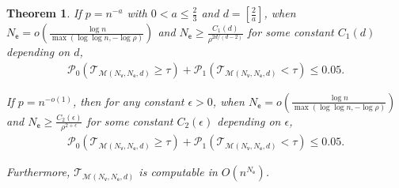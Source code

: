 \documentclass[letterpaper,11pt]{article}
\newtheorem{theorem}{Theorem}
\theoremstyle{definition}
\newcommand{\maM}{\mathcal{M}}
\newcommand{\maP}{\mathcal{P}}
\newcommand{\maT}{\mathcal{T}}
\newcommand{\pth}[1]{\left( #1 \right)}
\newcommand{\qth}[1]{\left[ #1 \right]}
\newcommand{\sfe}{{\mathsf{e}}}
\newcommand{\sfv}{{\mathsf{v}}}
\begin{document}
\begin{theorem}\label{thm:bd-degree-motif-main}
     If $p=n^{-a}$ with $0<a\le \frac{2}{3}$ and  $d=\qth{\frac{2}{a}}$, when $N_\sfe=o\pth{\frac{\log n}{\max\pth{\log\log n,-\log\rho}}}$ and $N_\sfe\ge \frac{C_1(d)}{\rho^{2d/(d-2)}}$ for some constant $C_1(d)$ depending on $d$,\begin{align*}
        \maP_0\pth{\maT_{\maM(N_\sfv,N_\sfe,d)}\ge \tau}+\maP_1\pth{\maT_{\maM(N_\sfv,N_\sfe,d)}<\tau}\le 0.05.
    \end{align*}

    If $p=n^{-o(1)}$, then for any constant $\epsilon>0$, when $N_\sfe = o\pth{\frac{\log n}{\max\pth{\log\log n,-\log\rho}}}$ and $N_\sfe\ge \frac{C_2(\epsilon)}{\rho^{2+\epsilon}}$ for some constant $C_2(\epsilon)$ depending on $\epsilon$,\begin{align*}
        \maP_0\pth{\maT_{\maM(N_\sfv,N_\sfe,d)}\ge \tau}+\maP_1\pth{\maT_{\maM(N_\sfv,N_\sfe,d)}<\tau}\le 0.05.
    \end{align*}

    Furthermore, $\maT_{\maM(N_\sfv,N_\sfe,d)}$ is  computable in $O(n^{N_\sfe})$.
\end{theorem}
\end{document}
